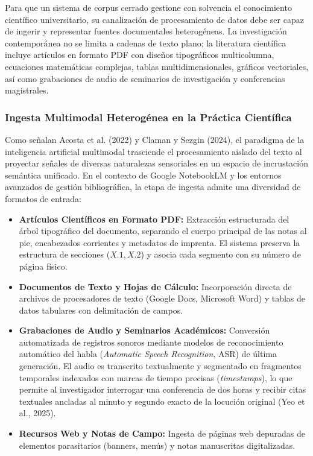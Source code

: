 Para que un sistema de corpus cerrado gestione con solvencia el conocimiento científico universitario, su canalización de procesamiento de datos debe ser capaz de ingerir y representar fuentes documentales heterogéneas. La investigación contemporánea no se limita a cadenas de texto plano; la literatura científica incluye artículos en formato PDF con diseños tipográficos multicolumna, ecuaciones matemáticas complejas, tablas multidimensionales, gráficos vectoriales, así como grabaciones de audio de seminarios de investigación y conferencias magistrales.

\subsubsection{Ingesta Multimodal Heterogénea en la Práctica Científica}

Como señalan Acosta et al. (2022) y Claman y Sezgin (2024), el paradigma de la inteligencia artificial multimodal trasciende el procesamiento aislado del texto al proyectar señales de diversas naturalezas sensoriales en un espacio de incrustación semántica unificado. En el contexto de Google NotebookLM y los entornos avanzados de gestión bibliográfica, la etapa de ingesta admite una diversidad de formatos de entrada:

\begin{itemize}
    \item \textbf{Artículos Científicos en Formato PDF:} Extracción estructurada del árbol tipográfico del documento, separando el cuerpo principal de las notas al pie, encabezados corrientes y metadatos de imprenta. El sistema preserva la estructura de secciones ($X.1, X.2$) y asocia cada segmento con su número de página físico.
    \item \textbf{Documentos de Texto y Hojas de Cálculo:} Incorporación directa de archivos de procesadores de texto (Google Docs, Microsoft Word) y tablas de datos tabulares con delimitación de campos.
    \item \textbf{Grabaciones de Audio y Seminarios Académicos:} Conversión automatizada de registros sonoros mediante modelos de reconocimiento automático del habla (\textit{Automatic Speech Recognition}, ASR) de última generación. El audio es transcrito textualmente y segmentado en fragmentos temporales indexados con marcas de tiempo precisas (\textit{timestamps}), lo que permite al investigador interrogar una conferencia de dos horas y recibir citas textuales ancladas al minuto y segundo exacto de la locución original (Yeo et al., 2025).
    \item \textbf{Recursos Web y Notas de Campo:} Ingesta de páginas web depuradas de elementos parasitarios (banners, menús) y notas manuscritas digitalizadas.
\end{itemize}

